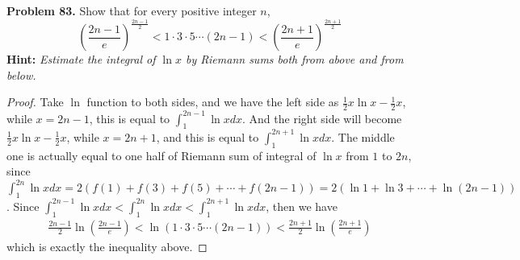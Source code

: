\documentclass[12pt,leqno]{amsart}
\begin{document}
\noindent
{\bf Problem 83.}
Show that for every positive integer $n$,
$$
\left(\frac{2n-1}{e}\right)^{\frac{2n-1}{2}}<1 \cdot 3\cdot 5\cdots(2n-1)<
\left(\frac{2n+1}{e}\right)^{\frac{2n+1}{2}}
$$
{\bf Hint:} {\em Estimate the integral of $\ln x$ by Riemann sums both from above and from below.}
\begin{proof}
Take $\ln$ function to both sides, and we have the left side as $\frac{1}{2}x\ln x - \frac{1}{2}x$, while $x = 2n - 1$, this is equal to $\int^{2n-1}_1\ln x dx$. And the right side will become $\frac{1}{2}x\ln x - \frac{1}{2}x$, while $x = 2n+1$, and this is equal to $\int^{2n+1}_1\ln x dx$. The middle one is actually equal to one half of Riemann sum of integral of $\ln x$ from $1$ to $2n$, since $\int^{2n}_1 \ln x dx = 2 (f(1) + f(3) + f(5) + \cdots + f(2n-1)) = 2 (\ln 1 + \ln 3 + \cdots + \ln(2n-1))$. Since $\int^{2n-1}_1\ln x dx<\int^{2n}_1\ln x dx<\int^{2n+1}_1\ln x dx$, then we have 
\begin{align*}
    \frac{2n-1}{2}\ln \left(\frac{2n-1}{e}\right) < \ln(1 \cdot 3\cdot 5\cdots(2n-1)) < \frac{2n+1}{2}\ln \left(\frac{2n+1}{e}\right)
\end{align*}
which is exactly the inequality above.
\end{proof}
\end{document}
